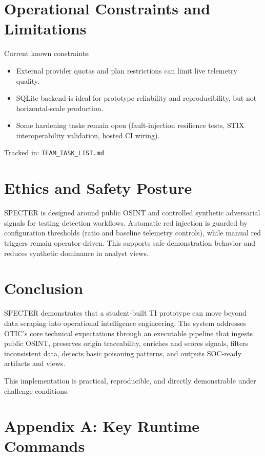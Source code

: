 \documentclass[11pt,a4paper]{article}
\begin{document}
\section{Operational Constraints and Limitations}

Current known constraints:
\begin{itemize}[leftmargin=1.5em]
    \item External provider quotas and plan restrictions can limit live telemetry quality.
    \item SQLite backend is ideal for prototype reliability and reproducibility, but not horizontal-scale production.
    \item Some hardening tasks remain open (fault-injection resilience tests, STIX interoperability validation, hosted CI wiring).
\end{itemize}

Tracked in: \texttt{TEAM\_TASK\_LIST.md}

\section{Ethics and Safety Posture}

SPECTER is designed around public OSINT and controlled synthetic adversarial signals for testing detection workflows. Automatic red injection is guarded by configuration thresholds (ratio and baseline telemetry controls), while manual red triggers remain operator-driven. This supports safe demonstration behavior and reduces synthetic dominance in analyst views.

\section{Conclusion}

SPECTER demonstrates that a student-built TI prototype can move beyond data scraping into operational intelligence engineering. The system addresses OTIC’s core technical expectations through an executable pipeline that ingests public OSINT, preserves origin traceability, enriches and scores signals, filters inconsistent data, detects basic poisoning patterns, and outputs SOC-ready artifacts and views.

This implementation is practical, reproducible, and directly demonstrable under challenge conditions.

\section*{Appendix A: Key Runtime Commands}
\end{document}
